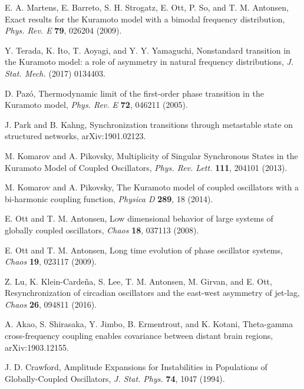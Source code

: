 \begin{thebibliography}{99}
  E. A. Martens, E. Barreto, S. H. Strogatz, E. Ott, P. So, and T. M. Antonsen, Exact results for the Kuramoto model with a bimodal frequency distribution, \textit{Phys. Rev. E} \textbf{79}, 026204 (2009).

  Y. Terada, K. Ito, T. Aoyagi, and Y. Y. Yamaguchi, Nonstandard transition in the Kuramoto model: a role of asymmetry in natural frequency distributions, \textit{J. Stat. Mech.} (2017) 0134403.

  D. Paz\'{o},
  Thermodynamic limit of the first-order phase transition in the Kuramoto model,
  \textit{Phys. Rev. E} {\bf 72}, 046211 (2005).

  J. Park and B. Kahng,
  Synchronization transitions through metastable state on structured networks,
  arXiv:1901.02123.

  M. Komarov and A. Pikovsky,
  Multiplicity of Singular Synchronous States in the Kuramoto Model of Coupled Oscillators,
  \textit{Phys. Rev. Lett.} {\bf 111}, 204101 (2013).

  M. Komarov and A. Pikovsky,
  The Kuramoto model of coupled oscillators with a bi-harmonic coupling function,
  \textit{Physica D} {\bf 289}, 18 (2014).

  E. Ott and T. M. Antonsen, Low dimensional behavior of large systems of globally coupled oscillators, \textit{Chaos} \textbf{18}, 037113 (2008).

  E. Ott and T. M. Antonsen,
  Long time evolution of phase oscillator systems,
  \textit{Chaos} {\bf 19}, 023117 (2009).

  Z. Lu, K. Klein-Carde\~{n}a, S. Lee, T. M. Antonsen, M. Girvan, and E. Ott,
  Resynchronization of circadian oscillators and the east-west asymmetry of jet-lag,
  \textit{Chaos} \textbf{26}, 094811 (2016).
  
  A. Akao, S. Shirasaka, Y. Jimbo, B. Ermentrout, and K. Kotani,
  Theta-gamma cross-frequency coupling enables covariance between distant brain regions,
  arXiv:1903.12155.

  J. D. Crawford, Amplitude Expansions for Instabilities in Populations of Globally-Coupled Oscillators, 
  \textit{J. Stat. Phys.} 
  \textbf{74}, 1047 (1994). 


\end{thebibliography}

